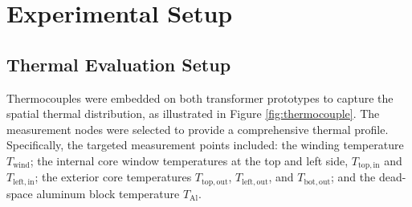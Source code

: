 \begin{table}[h!]
    \centering
    \caption{Specifications of the Prototype Transformers}
    
    \setlength{\tabcolsep}{3pt} %
    \label{tab:prototype_specs}
\end{table}

\section{Experimental Setup}
\subsection{Thermal Evaluation Setup}
Thermocouples were embedded on both transformer prototypes to capture the spatial thermal distribution, as illustrated in Figure \ref{fig:thermocouple}. The measurement nodes were selected to provide a comprehensive thermal profile. Specifically, the targeted measurement points included: the winding temperature $T_{\mathrm{wind}}$; the internal core window temperatures at the top and left side, $T_{\mathrm{top, in}}$ and $T_{\mathrm{left, in}}$; the exterior core temperatures $T_{\mathrm{top, out}}$, $T_{\mathrm{left, out}}$, and $T_{\mathrm{bot, out}}$; and the dead-space aluminum block temperature $T_{\mathrm{Al}}$.


